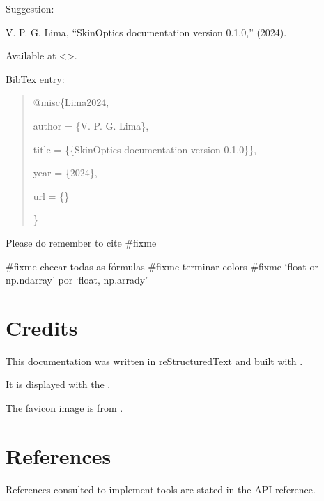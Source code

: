 \documentclass[letterpaper,10pt,english]{sphinxmanual}
\begin{document}
\sphinxAtStartPar
Suggestion:

\begin{DUlineblock}{0em}
\item[] V. P. G. Lima, “SkinOptics documentation \sphinxhyphen{} version 0.1.0,” (2024).
\item[] Available at \textless{}\textgreater{}.
\end{DUlineblock}

\sphinxAtStartPar
BibTex entry:
\begin{quote}

\begin{DUlineblock}{0em}
\item[] @misc\{Lima2024,
\item[]
\begin{DUlineblock}{\DUlineblockindent}
\item[] author = \{V. P. G. Lima\},
\item[] title = \{\{SkinOptics documentation \sphinxhyphen{} version 0.1.0\}\},
\item[] year  = \{2024\},
\item[] url   = \{\}
\end{DUlineblock}
\item[] \}
\end{DUlineblock}
\end{quote}

\sphinxAtStartPar
Please do remember to cite \#fixme

\sphinxAtStartPar
\#fixme checar todas as fórmulas
\#fixme terminar colors
\#fixme ‘float or np.ndarray’ por ‘float, np.arrady’


\chapter{Credits}
\label{\detokenize{index:credits}}
\begin{DUlineblock}{0em}
\item[] This documentation was written in reStructuredText and built with .
\item[] It is displayed with the .
\item[] The favicon image is from .
\end{DUlineblock}


\chapter{References}
\label{\detokenize{index:references}}
\begin{DUlineblock}{0em}
\item[] References consulted to implement  tools are stated in the API reference.
\end{DUlineblock}
\end{document}
